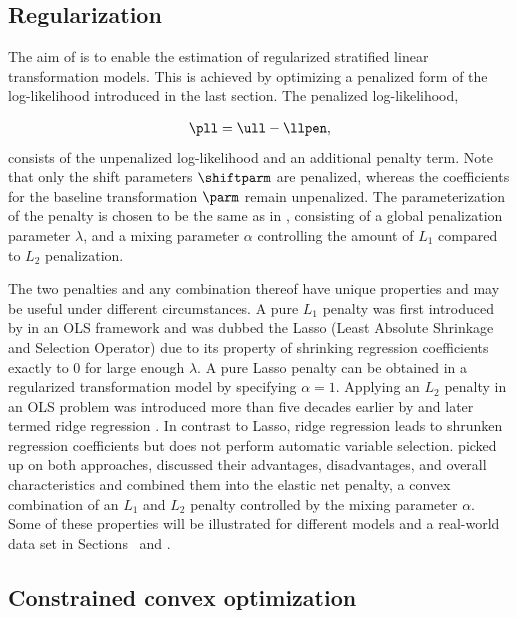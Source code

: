 \subsection{Regularization} \label{regul}

The aim of  is to enable the estimation of regularized stratified
linear transformation models. This is achieved by optimizing a penalized
form of the log-likelihood introduced in the last section. The penalized
log-likelihood,

\begin{align*}
  \pll = \ull - \llpen,
\end{align*}
consists of the unpenalized log-likelihood and an additional penalty term. Note
that only the shift parameters $\shiftparm$ are penalized, whereas the coefficients
for the baseline transformation $\parm$ remain unpenalized.
The parameterization of the penalty is chosen to be the same as in ,
consisting of a global penalization parameter $\lambda$, and a mixing parameter
$\alpha$ controlling the amount of $L_1$ compared to $L_2$ penalization.

The two penalties and any combination thereof have unique properties and may be useful
under different circumstances. A pure $L_1$ penalty was first introduced by \citet{lasso1996}
in an OLS framework and was dubbed the Lasso (Least Absolute
Shrinkage and Selection Operator) due to its property of shrinking
regression coefficients exactly to 0 for large enough $\lambda$. A pure Lasso
penalty can be obtained in a regularized transformation model by specifying
$\alpha = 1$. Applying an $L_2$ penalty in an OLS problem was introduced more than
five decades earlier by \citet{tikhonov1943stability} and later termed ridge
regression \citep{hoerl1970ridge}.
In contrast to Lasso, ridge regression leads to shrunken regression coefficients
but does not perform automatic variable selection. \citet{zou2005regularization}
picked up on both approaches, discussed their advantages, disadvantages, and
overall characteristics and combined them into the elastic net penalty,
a convex combination of an $L_1$ and $L_2$ penalty controlled by the mixing
parameter $\alpha$.
Some of these properties will be illustrated for different models and a real-world
data set in Sections~ and .

\subsection{Constrained convex optimization} \label{subsec:CVXR}

